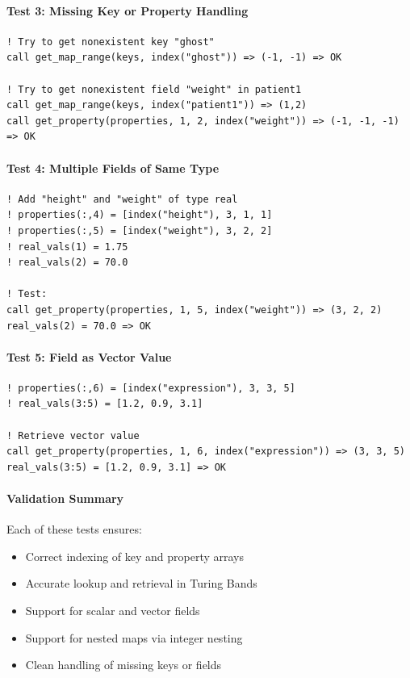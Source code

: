 \documentclass{article}
\begin{document}
\paragraph{Test 3: Missing Key or Property Handling}

\begin{verbatim}
! Try to get nonexistent key "ghost"
call get_map_range(keys, index("ghost")) => (-1, -1) => OK

! Try to get nonexistent field "weight" in patient1
call get_map_range(keys, index("patient1")) => (1,2)
call get_property(properties, 1, 2, index("weight")) => (-1, -1, -1) => OK
\end{verbatim}

\paragraph{Test 4: Multiple Fields of Same Type}

\begin{verbatim}
! Add "height" and "weight" of type real
! properties(:,4) = [index("height"), 3, 1, 1]
! properties(:,5) = [index("weight"), 3, 2, 2]
! real_vals(1) = 1.75
! real_vals(2) = 70.0

! Test:
call get_property(properties, 1, 5, index("weight")) => (3, 2, 2)
real_vals(2) = 70.0 => OK
\end{verbatim}

\paragraph{Test 5: Field as Vector Value}

\begin{verbatim}
! properties(:,6) = [index("expression"), 3, 3, 5]
! real_vals(3:5) = [1.2, 0.9, 3.1]

! Retrieve vector value
call get_property(properties, 1, 6, index("expression")) => (3, 3, 5)
real_vals(3:5) = [1.2, 0.9, 3.1] => OK
\end{verbatim}

\paragraph{Validation Summary}
Each of these tests ensures:
\begin{itemize}
  \item Correct indexing of key and property arrays
  \item Accurate lookup and retrieval in Turing Bands
  \item Support for scalar and vector fields
  \item Support for nested maps via integer nesting
  \item Clean handling of missing keys or fields
\end{itemize}
\end{document}

